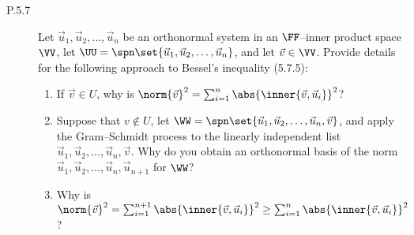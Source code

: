 \documentclass{homework}
\begin{document}
\begin{description}
\begin{enumerate}
\begin{solution}
    \end{solution}
  \end{enumerate}

\item[P.5.7]
  Let \(\vec u_1, \vec u_2, \dots, \vec u_n\) be an orthonormal system
  in an \(\FF\)--inner product space \(\VV\), let
  \(\UU = \spn\set{\vec u_1, \vec u_2, \dots, \vec u_n}\), and let
  \(\vec v \in \VV\).  Provide details for the following approach to
  Bessel's inequality (5.7.5):
  \begin{enumerate}
  \item If \(\vec v \in U\), why is
    \(\norm{\vec v}^2 = \sum_{i=1}^n \abs{\inner{\vec v, \vec
        u_i}}^2\)?

    \begin{solution}

    \end{solution}

  \item Suppose that \(v \not\in U\), let
    \(\WW = \spn\set{\vec u_1, \vec u_2, \dots, \vec u_n, \vec v}\),
    and apply the Gram--Schmidt process to the linearly independent
    list \(\vec u_1, \vec u_2, \dots, \vec u_n, \vec v\).  Why do you
    obtain an orthonormal basis of the norm
    \(\vec u_1, \vec u_2, \dots, \vec u_n, \vec u_{n+1}\) for \(\WW\)?

    \begin{solution}

    \end{solution}

  \item Why is
    \(\norm{\vec v}^2 = \sum_{i=1}^{n+1} \abs{\inner{\vec v, \vec
        u_i}}^2 \ge \sum_{i=1}^n \abs{\inner{\vec v, \vec u_i}}^2\)?

    \begin{solution}

    \end{solution}
  \end{enumerate}
\end{description}
\end{document}
